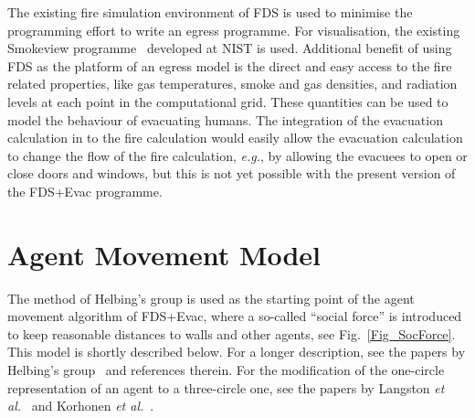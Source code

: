 \documentclass[12pt,a4paper,final,twoside]{stylevk}
\begin{document}
The existing fire simulation environment of FDS is used to minimise
the programming effort to write an egress programme.  For
visualisation, the existing Smokeview programme~\cite{SV_UserGuide}
developed at NIST is used.  Additional benefit of using FDS as the
platform of an egress model is the direct and easy access to the fire
related properties, like gas temperatures, smoke and gas densities,
and radiation levels at each point in the computational grid.  These
quantities can be used to model the behaviour of evacuating humans.
The integration of the evacuation calculation in to the fire
calculation would easily allow the evacuation calculation to change
the flow of the fire calculation, \emph{e.g.}, by allowing the
evacuees to open or close doors and windows, but this is not yet
possible with the present version of the FDS+Evac programme.


\section{Agent Movement Model}\label{Sec_MoveModel}

\noindent The method of Helbing's group is used as the starting point
of the agent movement algorithm of FDS+Evac, where a so-called
``social force'' is introduced to keep reasonable distances to walls
and other agents, see Fig.~\ref{Fig_SocForce}.  This model is
shortly described below.  For a longer description, see the papers by
Helbing's group~\cite{Helbing95, Helbing00, Helbing02, Werner03} and
references therein.  For the modification of the one-circle
representation of an agent to a three-circle one, see the papers by
Langston {\em et al.}~\cite{Langston06} and Korhonen {\em et
  al.}~\cite{Korhonen07a, Korhonen07b, Korhonen08a, Korhonen08b}.
\end{document}
